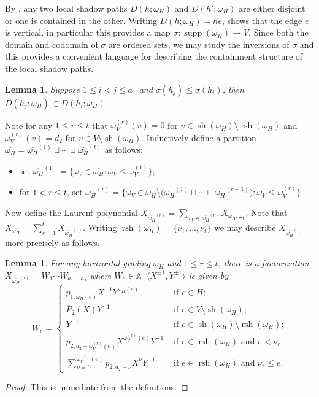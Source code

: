 \documentclass{amsart}
\newtheorem{lemma}[theorem]{Lemma}
\renewcommand{\AA}{\mathbb{A}}
\newcommand{\supp}{\operatorname{supp}}
\newcommand{\rsh}{\operatorname{rsh}}
\newcommand{\sh}{\operatorname{sh}}
\begin{document}
By \cite[Lemma~4.10]{rupel2}, any two local shadow paths $D(h;\omega_H)$ and $D(h';\omega_H)$ are either disjoint or one is contained in the other.  Writing $D(h;\omega_H)=he$, \cite[Lemma~4.8]{rupel2} shows that the edge $e$ is vertical, in particular this provides a map $\sigma:\supp(\omega_H)\to V$.  Since both the domain and codomain of $\sigma$ are ordered sets, we may study the inversions of $\sigma$ and this provides a convenient language for describing the containment structure of the local shadow paths.
\begin{lemma}
 Suppose $1\le i<j\le a_1$ and $\sigma(h_j)\le\sigma(h_i)$, then $D(h_j;\omega_H)\subset D(h_i;\omega_H)$.
\end{lemma}







Note for any $1\le r\le t$ that $\omega_V^{(r)}(v)=0$ for $v\in\sh(\omega_H)\setminus\rsh(\omega_H)$ and $\omega_V^{(r)}(v)=d_2$ for $v\in V\setminus\sh(\omega_H)$.  Inductively define a partition $\overline{\omega_H}=\overline{\omega_H}^{(1)}\sqcup\cdots\sqcup\overline{\omega_H}^{(t)}$ as follows:
\begin{itemize}
 \item set $\overline{\omega_H}^{(1)}=\big\{\omega_V\in\overline{\omega_H}:\omega_V\le\omega_V^{(1)}\big\}$;
 \item for $1<r\le t$, set $\overline{\omega_H}^{(r)}=\Big\{\omega_V\in\overline{\omega_H}\setminus\big(\overline{\omega_H}^{(1)}\sqcup\cdots\sqcup\overline{\omega_H}^{(r-1)}\big):\omega_V\le\omega_V^{(r)}\Big\}$.
\end{itemize}
Now define the Laurent polynomial $X_{\overline{\omega_H}^{(r)}}=\sum\limits_{\omega_V\in\overline{\omega_H}^{(r)}} X_{\omega_H,\omega_V}$.  Note that $X_{\overline{\omega_H}}=\sum\limits_{r=1}^t  X_{\overline{\omega_H}^{(r)}}$.  Writing $\rsh(\omega_H)=\{\nu_1,\ldots,\nu_t\}$ we may describe $X_{\overline{\omega_H}^{(r)}}$ more precisely as follows.
\begin{lemma}
 For any horizontal grading $\omega_H$ and $1\le r\le t$, there is a factorization $X_{\overline{\omega_H}^{(r)}}=W_1\cdots W_{a_1+a_2}$ where $W_e\in\AA_+\langle X^{\pm1},Y^{\pm1}\rangle$ is given by
 \[W_e=\begin{cases}p_{1,\omega_H(e)}X^{-1}Y^{\omega_H(e)} & \text{ if $e\in H$;}\\ \overline{P}_2(X)Y^{-1} & \text{ if $e\in V\setminus\sh(\omega_H);$}\\ Y^{-1} & \text{ if $e\in\sh(\omega_H)\setminus\rsh(\omega_H)$;}\\ p_{2,d_2-\omega_V^{(r)}(e)}X^{\omega_V^{(r)}(e)}Y^{-1} & \text{ if $e\in\rsh(\omega_H)$ and $e<\nu_r$;}\\ \sum\limits_{\nu=0}^{\omega_V^{(r)}(e)}p_{2,d_2-\nu}X^\nu Y^{-1} & \text{ if $e\in\rsh(\omega_H)$ and $\nu_r\le e$.}\end{cases}\]
\end{lemma}
\begin{proof}
 This is immediate from the definitions.
\end{proof}
\end{document}

